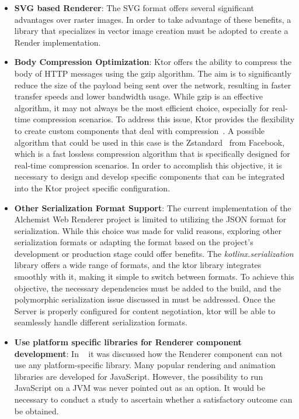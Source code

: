 \begin{itemize}
	\item \textbf{SVG based Renderer}: The SVG format offers several significant advantages over raster images. In order to take advantage of these benefits, a library that specializes in vector image creation must be adopted to create a Render implementation.
	\item \textbf{Body Compression Optimization}: Ktor offers the ability to compress the body of HTTP messages using the gzip algorithm. The aim is to significantly reduce the size of the payload being sent over the network, resulting in faster transfer speeds and lower bandwidth usage. While gzip is an effective algorithm, it may not always be the most efficient choice, especially for real-time compression scenarios. To address this issue, Ktor provides the flexibility to create custom components that deal with compression~\cite{Compress32:online}. A possible algorithm that could be used in this case is the Zstandard~\cite{Zstandar68:online} from Facebook, which is a fast lossless compression algorithm that is specifically designed for real-time compression scenarios. In order to accomplish this objective, it is necessary to design and develop specific components that can be integrated into the Ktor project specific configuration.
	\item \textbf{Other Serialization Format Support}: The current implementation of the Alchemist Web Renderer project is limited to utilizing the JSON format for serialization. While this choice was made for valid reasons, exploring other serialization formats or adapting the format based on the project's development or production stage could offer benefits. The \textit{kotlinx.serialization} library offers a wide range of formats, and the ktor library integrates smoothly with it, making it simple to switch between formats. To achieve this objective, the necessary dependencies must be added to the build, and the polymorphic serialization issue discussed in  must be addressed. Once the Server is properly configured for content negotiation, ktor will be able to seamlessly handle different serialization formats.
	\item \textbf{Use platform specific libraries for Renderer component development}: In ~ it was discussed how the Renderer component can not use any platform-specific library. Many popular rendering and animation libraries are developed for JavaScript. However, the possibility to run JavaScript on a JVM was never pointed out as an option. It would be necessary to conduct a study to ascertain whether a satisfactory outcome can be obtained.
\end{itemize}
